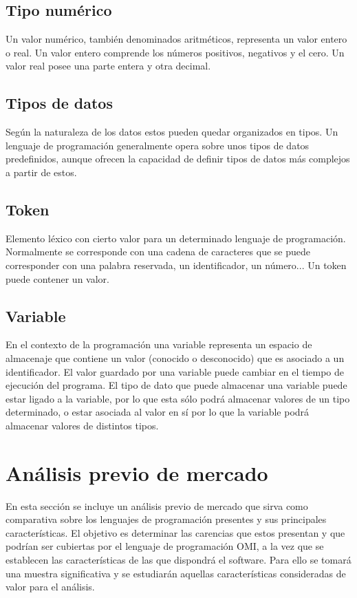 \subsection {Tipo numérico}
Un valor numérico, también denominados aritméticos, representa un valor entero o real. Un valor entero comprende los números positivos, negativos y el cero. Un valor real
posee una parte entera y otra decimal.\\

\subsection{Tipos de datos}
Según la naturaleza de los datos estos pueden quedar organizados en tipos. Un lenguaje de programación generalmente opera sobre unos tipos de datos 
predefinidos, aunque ofrecen la capacidad de definir tipos de datos más complejos a partir de estos.\\

\subsection{Token}
Elemento léxico con cierto valor para un determinado lenguaje de programación. Normalmente se corresponde con una cadena de
caracteres que se puede corresponder con una palabra reservada, un identificador, un número... Un token puede contener un 
valor.\\

\subsection{Variable}
En el contexto de la programación una variable representa un espacio de almacenaje que contiene un valor (conocido o desconocido) que es asociado a un identificador.
El valor guardado por una variable puede cambiar en el tiempo de ejecución del programa. El tipo de dato que puede almacenar una variable puede estar ligado a la 
variable, por lo que esta sólo podrá almacenar valores de un tipo determinado, o estar asociada al valor en sí por lo que la variable podrá almacenar valores de 
distintos tipos.\\

\section{Análisis previo de mercado}
En esta sección se incluye un análisis previo de mercado que sirva como comparativa sobre los lenguajes de programación presentes y sus principales 
características. El objetivo es determinar las carencias que estos presentan y que podrían ser cubiertas por el lenguaje de programación OMI, a la vez que
se establecen las características de las que dispondrá el software.
Para ello se tomará una muestra significativa y se estudiarán aquellas características consideradas de valor para el análisis.


